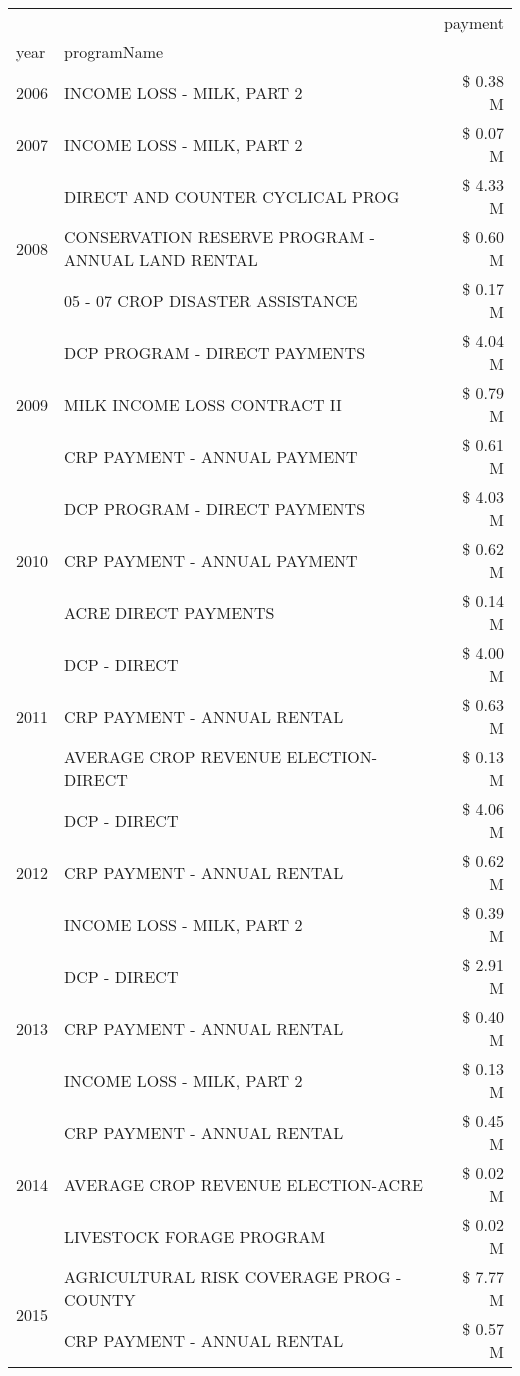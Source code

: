 \begin{tabular}{llr}
\toprule
 &  & payment \\
year & programName &  \\
\midrule
2006 & INCOME LOSS - MILK, PART 2 & \$ 0.38 M \\
\cline{1-3}
2007 & INCOME LOSS - MILK, PART 2 & \$ 0.07 M \\
\cline{1-3}
\multirow[t]{3}{*}{2008} & DIRECT AND COUNTER CYCLICAL PROG & \$ 4.33 M \\
 & CONSERVATION RESERVE PROGRAM - ANNUAL LAND RENTAL & \$ 0.60 M \\
 & 05 - 07 CROP DISASTER ASSISTANCE & \$ 0.17 M \\
\cline{1-3}
\multirow[t]{3}{*}{2009} & DCP PROGRAM - DIRECT PAYMENTS & \$ 4.04 M \\
 & MILK INCOME LOSS CONTRACT II & \$ 0.79 M \\
 & CRP PAYMENT - ANNUAL PAYMENT & \$ 0.61 M \\
\cline{1-3}
\multirow[t]{3}{*}{2010} & DCP PROGRAM - DIRECT PAYMENTS & \$ 4.03 M \\
 & CRP PAYMENT - ANNUAL PAYMENT & \$ 0.62 M \\
 & ACRE DIRECT PAYMENTS & \$ 0.14 M \\
\cline{1-3}
\multirow[t]{3}{*}{2011} & DCP - DIRECT & \$ 4.00 M \\
 & CRP PAYMENT - ANNUAL RENTAL & \$ 0.63 M \\
 & AVERAGE CROP REVENUE ELECTION-DIRECT & \$ 0.13 M \\
\cline{1-3}
\multirow[t]{3}{*}{2012} & DCP - DIRECT & \$ 4.06 M \\
 & CRP PAYMENT - ANNUAL RENTAL & \$ 0.62 M \\
 & INCOME LOSS - MILK, PART 2 & \$ 0.39 M \\
\cline{1-3}
\multirow[t]{3}{*}{2013} & DCP - DIRECT & \$ 2.91 M \\
 & CRP PAYMENT - ANNUAL RENTAL & \$ 0.40 M \\
 & INCOME LOSS - MILK, PART 2 & \$ 0.13 M \\
\cline{1-3}
\multirow[t]{3}{*}{2014} & CRP PAYMENT - ANNUAL RENTAL & \$ 0.45 M \\
 & AVERAGE CROP REVENUE ELECTION-ACRE & \$ 0.02 M \\
 & LIVESTOCK FORAGE PROGRAM & \$ 0.02 M \\
\cline{1-3}
\multirow[t]{3}{*}{2015} & AGRICULTURAL RISK COVERAGE PROG - COUNTY & \$ 7.77 M \\
 & CRP PAYMENT - ANNUAL RENTAL & \$ 0.57 M \\

\end{tabular}
